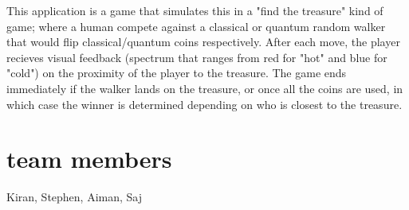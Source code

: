 \documentclass[11pt]{article}
\begin{document}
This application is a game that simulates this in a "find the treasure" kind of game; where a human compete against a classical or quantum random walker  that would flip classical/quantum coins respectively. After each move, the player recieves visual feedback (spectrum that ranges from red for "hot" and blue for "cold") on the proximity of the player to the treasure. The game ends immediately if the walker lands on the treasure, or once all the coins are used, in which case the winner is determined depending on who is closest to the treasure.

\section{team members}
\label{sec-2}
Kiran, Stephen, Aiman, Saj
\end{document}
